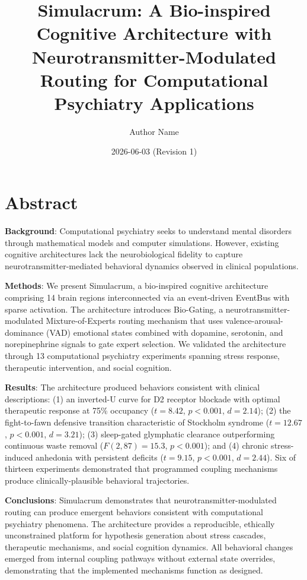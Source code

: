 \documentclass[10pt,a4paper]{article}
\title{Simulacrum: A Bio-inspired Cognitive Architecture with Neurotransmitter-Modulated Routing for Computational Psychiatry Applications}
\author{Author Name}
\date{2026-06-03 (Revision 1)}
\begin{document}
\maketitle

\section*{Abstract}

\textbf{Background}: Computational psychiatry seeks to understand mental disorders through mathematical models and computer simulations. However, existing cognitive architectures lack the neurobiological fidelity to capture neurotransmitter-mediated behavioral dynamics observed in clinical populations.

\textbf{Methods}: We present Simulacrum, a bio-inspired cognitive architecture comprising 14 brain regions interconnected via an event-driven EventBus with sparse activation. The architecture introduces Bio-Gating, a neurotransmitter-modulated Mixture-of-Experts routing mechanism that uses valence-arousal-dominance (VAD) emotional states combined with dopamine, serotonin, and norepinephrine signals to gate expert selection. We validated the architecture through 13 computational psychiatry experiments spanning stress response, therapeutic intervention, and social cognition.

\textbf{Results}: The architecture produced behaviors consistent with clinical descriptions: (1) an inverted-U curve for D2 receptor blockade with optimal therapeutic response at 75\% occupancy ($t=8.42$, $p<0.001$, $d=2.14$); (2) the fight-to-fawn defensive transition characteristic of Stockholm syndrome ($t=12.67$, $p<0.001$, $d=3.21$); (3) sleep-gated glymphatic clearance outperforming continuous waste removal ($F(2,87)=15.3$, $p<0.001$); and (4) chronic stress-induced anhedonia with persistent deficits ($t=9.15$, $p<0.001$, $d=2.44$). Six of thirteen experiments demonstrated that programmed coupling mechanisms produce clinically-plausible behavioral trajectories.

\textbf{Conclusions}: Simulacrum demonstrates that neurotransmitter-modulated routing can produce emergent behaviors consistent with computational psychiatry phenomena. The architecture provides a reproducible, ethically unconstrained platform for hypothesis generation about stress cascades, therapeutic mechanisms, and social cognition dynamics. All behavioral changes emerged from internal coupling pathways without external state overrides, demonstrating that the implemented mechanisms function as designed.
\end{document}
